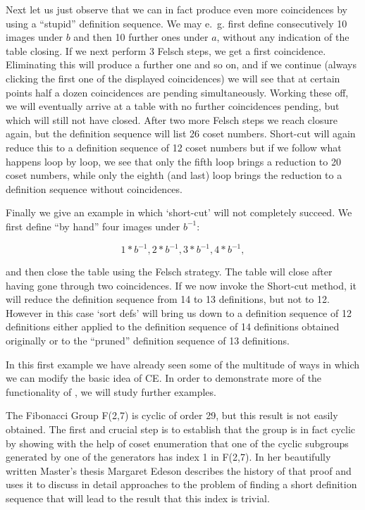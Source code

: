 Next let us just observe that we can in fact produce even more
coincidences by using a ``stupid'' definition sequence. We may e.~g.
first define consecutively 10 images under $b$ and then 10 further
ones under $a$, without any indication of the table closing. If we
next perform 3 Felsch steps, we get a first coincidence. Eliminating
this will produce a further one and so on, and if we continue (always
clicking the first one of the displayed coincidences) we will see
that at certain points half a dozen coincidences are pending
simultaneously. Working these off, we will eventually arrive at a
table with no further coincidences pending, but which will still not
have closed. After two more Felsch steps we reach closure again, but
the definition sequence will list 26 coset numbers. Short-cut will
again reduce this to a definition sequence of 12 coset numbers but
if we follow what happens loop by loop, we see that only the fifth
loop brings a reduction to 20 coset numbers, while only the eighth
(and last) loop brings the reduction to a definition sequence without
coincidences.

Finally we give an example in which `short-cut' will not completely
succeed. We first define ``by hand'' four images under $b^{-1}$:

$$
  1*b^{-1},
  2*b^{-1},
  3*b^{-1},
  4*b^{-1},
$$

and then close the table using the Felsch strategy. The table will
close after having gone through two coincidences. If we now invoke the
Short-cut method, it will reduce the definition sequence from 14 to
13 definitions, but not to 12. However in this case `sort defs'
will bring us down to a definition sequence of 12 definitions either
applied to the definition sequence of 14 definitions obtained
originally or to the ``pruned'' definition sequence of 13 definitions.

In this first example we have already seen some of the multitude of
ways in which we can modify the basic idea of CE. In order to
demonstrate more of the functionality of {\ITC}, we will study further
examples.



The Fibonacci Group F(2,7) is cyclic of order 29, but this result is
not easily obtained. The first and crucial step is to establish that
the group is in fact cyclic by showing with the help of coset
enumeration that one of the cyclic subgroups generated by one of the
generators has index 1 in F(2,7). In her beautifully written
Master's thesis \cite{Ede89} Margaret Edeson describes the history of
that proof and uses it to discuss in detail approaches to the problem
of finding a short definition sequence that will lead to the result
that this index is trivial.

